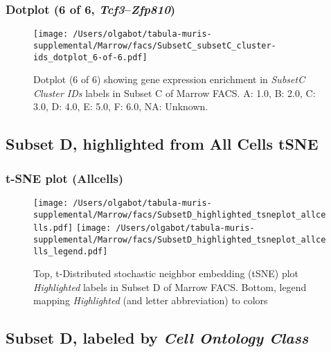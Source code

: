 \clearpage

\subsubsection{Dotplot (6 of 6, \emph{Tcf3}--\emph{Zfp810})}
\begin{figure}[h]
\centering
\texttt{[image: /Users/olgabot/tabula-muris-supplemental/Marrow/facs/SubsetC\_subsetC\_cluster-ids\_dotplot\_6-of-6.pdf]}

\caption{ Dotplot (6 of 6)  showing gene expression enrichment in \emph{SubsetC Cluster IDs} labels in Subset C of Marrow FACS. A: 1.0, B: 2.0, C: 3.0, D: 4.0, E: 5.0, F: 6.0, NA: Unknown.}
\end{figure}


\clearpage

\subsection{Subset D, highlighted from All Cells tSNE}

\subsubsection{t-SNE plot (Allcells)}
\begin{figure}[h]
\centering
\texttt{[image: /Users/olgabot/tabula-muris-supplemental/Marrow/facs/SubsetD\_highlighted\_tsneplot\_allcells.pdf]}
\texttt{[image: /Users/olgabot/tabula-muris-supplemental/Marrow/facs/SubsetD\_highlighted\_tsneplot\_allcells\_legend.pdf]}
\caption{Top, t-Distributed stochastic neighbor embedding (tSNE) plot  \emph{Highlighted} labels in Subset D of Marrow FACS. Bottom, legend mapping \emph{Highlighted} (and letter abbreviation) to colors}
\end{figure}


\clearpage

\subsection{Subset D, labeled by \emph{Cell Ontology Class}}
